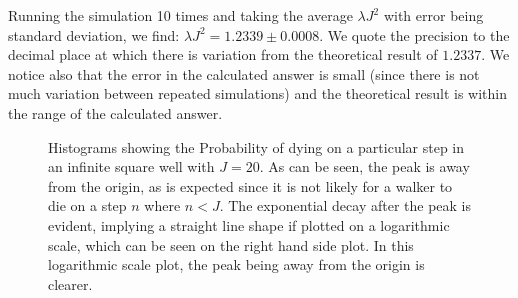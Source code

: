 \documentclass[journal]{IEEEtran}
\begin{document}
Running the simulation 10 times and taking the average $\lambda J^2$ with error
being standard deviation, we find: $\lambda J^2 = 1.2339 \pm 0.0008$. We quote
the precision to the decimal place at which there is variation from the
theoretical result of $1.2337$. We notice also that the error in the calculated
answer is small (since there is not much variation between repeated simulations)
and the theoretical result is within the range of the calculated answer.

\begin{figure}%
  \centering
  \centering
  \caption{Histograms showing the Probability of dying on a particular step in
    an infinite square well with $J = 20$. As can be seen, the peak is away from the
    origin, as is expected since it is not likely for a walker to die on a step $n$
    where $n < J$. The exponential decay after the peak is evident, implying a
    straight line shape if plotted on a logarithmic scale, which can be seen on
    the right hand side plot. In this logarithmic scale plot, the peak being away
    from the origin is clearer.}
  \label{fig:expplots}
\end{figure}
\end{document}
